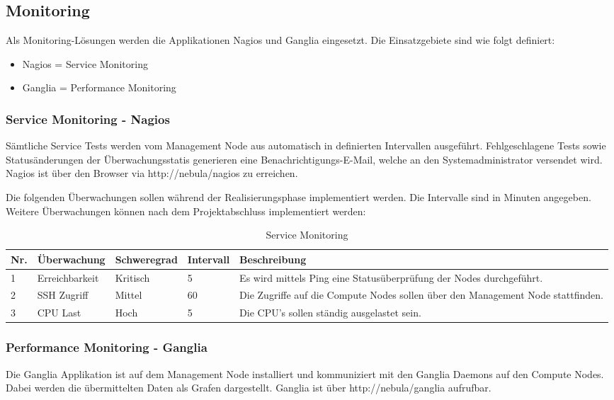 \subsection{Monitoring}
Als Monitoring-Lösungen werden die Applikationen Nagios und Ganglia eingesetzt. Die Einsatzgebiete sind wie folgt definiert:
\begin{itemize} 
\item {Nagios = Service Monitoring}
\item {Ganglia = Performance Monitoring}
\end{itemize}

\subsubsection{Service Monitoring - Nagios}
Sämtliche Service Tests werden vom Management Node aus automatisch in definierten Intervallen ausgeführt. Fehlgeschlagene Tests sowie Statusänderungen der Überwachungsstatis generieren eine Benachrichtigungs-E-Mail, welche an den Systemadministrator versendet wird. Nagios ist über den Browser via http://nebula/nagios zu erreichen.\newline

Die folgenden Überwachungen sollen während der Realisierungsphase implementiert werden. Die Intervalle sind in Minuten angegeben. Weitere Überwachungen können nach dem Projektabschluss implementiert werden:


\begin{table}[H]
\begin{tabular}[t]{p{0.6cm}p{2.5cm}p{2.2cm}p{1.5cm}p{8.8cm}}
\hline
\rowcolor{heading}\textbf{Nr.} & \textbf{Überwachung} & \textbf{Schweregrad} & \textbf{Intervall} &\textbf{Beschreibung} \\\hline
1 & Erreichbarkeit & Kritisch & 5 & Es wird mittels Ping eine Statusüberprüfung der Nodes durchgeführt. \\\hline
2 & SSH Zugriff & Mittel & 60 & Die Zugriffe auf die Compute Nodes sollen über den Management Node stattfinden.  \\\hline
3 & CPU Last & Hoch & 5 & Die CPU's sollen ständig ausgelastet sein.  \\\hline
\end{tabular}
\caption{Service Monitoring}
\end{table}

\subsubsection{Performance Monitoring - Ganglia}
Die Ganglia Applikation ist auf dem Management Node installiert und kommuniziert mit den Ganglia Daemons auf den Compute Nodes. Dabei werden die übermittelten Daten als Grafen dargestellt. Ganglia ist über http://nebula/ganglia aufrufbar.


